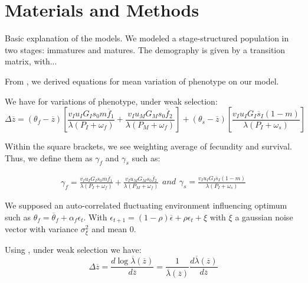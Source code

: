 \section*{Materials and Methods}

Basic explanation of the models. We modeled a stage-structured population in two stages: immatures and matures. The demography is given by a transition matrix, with...

From \citet{engen_evolution_2011}, we derived equations for mean variation of phenotype on our model.

We have for variations of phenotype, under weak selection:
\begin{equation}
\Delta\overline{z} = (\theta_{f} - \overline{z}) \left[ \frac{ v_{I} u_{I} G_{I} s_{0} m \overline{f}_{1} }{\lambda(P_{I}+\omega_{f})} + \frac{ v_{I} u_{M} G_{M} s_{0} \overline{f}_{2}} {\lambda ( P_{M} + \omega_{f} )} \right] + (\theta_{s} - \overline{z}) \left[ \frac{ v_{I} u_{I} G_{I} \overline{s}_{I} (1-m) }{\lambda(P_{I}+\omega_{s})} \right]
\end{equation}

Within the square brackets, we see weighting average of fecundity and survival. Thus, we define them as $\gamma_{f}$ and $\gamma_{s}$ such as:

\begin{subequations}
	\begin{align}
	\gamma_{f} = \frac{ v_{I} u_{I} G_{I} s_{0} m \overline{f}_{1} }{\lambda(P_{I}+\omega_{f})} + \frac{ v_{I} u_{M} G_{M} s_{0} \overline{f}_{2}} {\lambda ( P_{M} + \omega_{f} )}
	\end{align}
	and
	\begin{align}
	\gamma_{s} = \frac{ v_{I} u_{I} G_{I} \overline{s}_{I} (1-m) }{\lambda(P_{I}+\omega_{s})}
	\end{align}
\end{subequations}

We supposed an auto-correlated fluctuating environment influencing optimum such as $\theta_{f} = \overline{\theta}_{f} + \alpha_{f}\epsilon_{t}$. With $\epsilon_{t+1} = (1-\rho)\overline{\epsilon} + \rho\epsilon_{t} + \xi$ with $\xi$ a gaussian noise vector with variance $\sigma^{2}_{\xi}$ and mean $0$.

Using \citet{lande_adaptation_2009}, under weak selection we have:
\begin{equation}
	\Delta\overline{z} = \frac{d\log\overline{\lambda}(\overline{z})}{d\overline{z}} = \frac{1}{\overline{\lambda}(\overline{z})} \frac{d\overline{\lambda}(\overline{z})}{d\overline{z}}
\end{equation}


